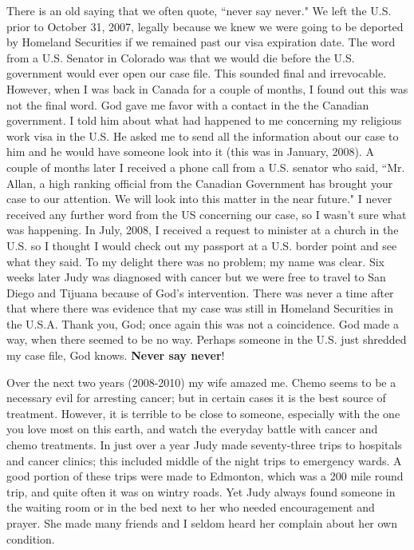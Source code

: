 \documentclass[oneside]{book}
\begin{document}
There is an old saying that we often quote, ``never say never." We left the U.S. prior to October 31, 2007, legally because we knew we were going to be deported by Homeland Securities if we remained past our visa expiration date. The word from a U.S. Senator in Colorado was that we would die before the U.S. government would ever open our case file. This sounded final and irrevocable. However, when I was back in Canada for a couple of months, I found out this was not the final word. God gave me favor with a contact in the the Canadian government. I told him about what had happened to me concerning my religious work visa in the U.S. He asked me to send all the information about our case to him and he would have someone look into it (this was in January, 2008).  A couple of months later I received a phone call from a U.S. senator who said, ``Mr. Allan, a high ranking official from the Canadian Government has brought your case to our attention. We will look into this matter in the near future." I never received any further word from the US concerning our case, so I wasn't sure what was happening. In July, 2008, I received a request to minister at a church in the U.S. so I thought I would check out my passport at a U.S. border point and see what they said. To my delight there was no problem; my name was clear. Six weeks later Judy was diagnosed with cancer but we were free to travel to San Diego and Tijuana because of God's intervention. There was never a time after that where there was evidence that my case was still in Homeland Securities in the U.S.A. Thank you, God; once again this was not a coincidence. God made a way, when there seemed to be no way. Perhaps someone in the U.S. just shredded my case file, God knows. \textbf{Never say never}!

Over the next two years (2008-2010) my wife amazed me. Chemo seems to be a necessary evil for arresting cancer; but in certain cases it is the best source of treatment. However, it is terrible to be close to someone, especially with the one you love most on this earth, and watch the everyday battle with cancer and chemo treatments. In just over a year Judy made seventy-three trips to hospitals and cancer clinics; this included middle of the night trips to emergency wards. A good portion of these trips were made to Edmonton, which was a 200 mile round trip, and quite often it was on wintry roads. Yet Judy always found someone in the waiting room or in the bed next to her who needed encouragement and prayer. She made many friends and I seldom heard her complain about her own condition.
\end{document}
